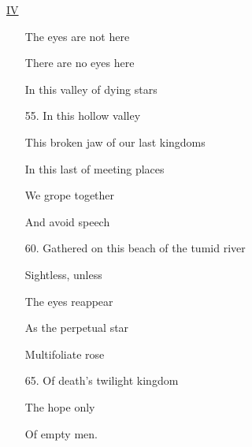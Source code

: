 \documentclass[10pt]{article}
\begin{document}
\begin{multicols}{2}
    \begin{minipage}[t][0.45\textheight]{0.4\textwidth}
        \begin{center} \underline{IV} \end{center}
        \begin{enumerate}[itemsep=0.5ex]
            \item[] The eyes are not here
            \item[] There are no eyes here
            \item[] In this valley of dying stars
            \item[55.] In this hollow valley
            \item[] This broken jaw of our last kingdoms
            \item[]
            \item[] In this last of meeting places
            \item[] We grope together
            \item[] And avoid speech
            \item[60.] Gathered on this beach of the tumid river
            \item[]
            \item[] Sightless, unless
            \item[] The eyes reappear
            \item[] As the perpetual star
            \item[] Multifoliate rose
            \item[65.] Of death's twilight kingdom
            \item[] The hope only
            \item[] Of empty men.
        \end{enumerate}
    \end{minipage}

\end{multicols}
\end{document}
